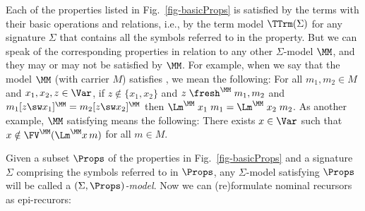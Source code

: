 Each of the properties listed in Fig.~\ref{fig-basicProps} 
is satisfied by the terms with their basic operations and relations, i.e., 
by the term model $\TTrm(\Sigma)$ for any signature $\Sigma$ that contains all the symbols referred to in the property. 
%
But we can %
speak of the corresponding properties in relation to any other $\Sigma$-model $\MM$, and they may or may not be satisfied by $\MM$. For example, when we say that the model $\MM$ (with carrier $M$) satisfies \SwCg{}, we mean the following:  
	For all $m_1,m_2\in M$ and $x_1,x_2,z\in \Var$, 
	if $z \not\in \{x_1,x_2\}$ and 
	$z\;\fresh^\MM\;m_1,m_2$ and 
	$m_1[z\sw x_1]^\MM = m_2[z\sw x_2]^\MM$ 
	then 
	$\Lm^\MM\;x_1\;m_1 = \Lm^\MM\;x_2\;m_2$. 
%
As another example, $\MM$ %
satisfying \FCB{} means the following: 
There exists $x \in \Var$ such that 
$x\notin \FV^\MM(\Lm^\MM x\,m)$ for all $m \in M$.  


Given a subset $\Props$ of the properties %
in Fig.~\ref{fig-basicProps} and %
a signature $\Sigma$ comprising the symbols referred to in $\Props$, any $\Sigma$-model satisfying $\Props$ will be called a \emph{$(\Sigma,\Props)$-model}. 
Now we can 
(re)formulate %
nominal recursors as epi-recurors: 


\newcommand\perFreeRec
{
\begin{tabular}{|c|}
	\hline
	$r_1$ \ (perm/free)%
	\\\hline
	\PmVr{}, \PmAp{}, \PmLm{}, 
	\\
	\PmId{}, \PmCp{},  
	\\
	\FvDPm{}, \FCB{} 
	\\
	\sout{\FSupFv{}} %
	\\\hline
\end{tabular}	
}

\newcommand\perFreeRecV
{
	\begin{tabular}{|c|}
		\hline
		$r_2$ \ (perm/free variant)%
		\\\hline
		\PmVr{}, \PmAp{}, \PmLm{}, 
		\\
		\PmId{}, \PmCp{},  
		\\
		\PmFv{}, \sout{\FvPm{}}, 
		\\
	    \FvVr{}, \FvAp{}, \FvLm{}  
		\\\hline
	\end{tabular}	
}

